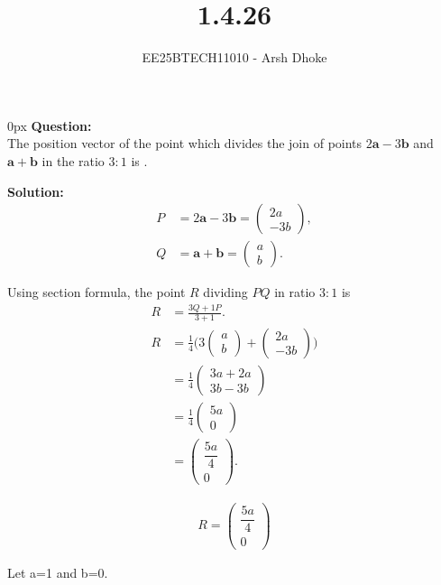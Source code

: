 \documentclass[journal]{IEEEtran}
\renewcommand{\vec}[1]{\mathbf{#1}}
\newcommand{\solution}{\textbf{Solution: }}
\newcommand{\brak}[1]{\begin{pmatrix}#1\end{pmatrix}}
\begin{document}

\vspace{3cm}

\title{1.4.26}
\author{EE25BTECH11010 - Arsh Dhoke}
{\let\newpage\relax\maketitle}

\renewcommand{\thefigure}{\theenumi}
\renewcommand{\thetable}{\theenumi}
\setlength{\intextsep}{10pt}

\parindent 0px
\textbf{Question:} \\
The position vector of the point which divides the join of points $2\vec{a} - 3\vec{b}$ and $\vec{a} + \vec{b}$ in the ratio $3:1$ is \underline{\hspace{2cm}}.

\solution \\

\begin{align}
P &= 2\vec{a} - 3\vec{b}
   = \brak{2a\\-3b}, \\
Q &= \vec{a} + \vec{b}
   = \brak{a\\b}.
\end{align}

Using section formula, the point $R$ dividing $PQ$ in ratio $3:1$ is
\begin{align}
R &= \frac{3Q + 1P}{3+1}. \\
R
&= \frac{1}{4}\Big(3\brak{a\\b}+\brak{2a\\-3b}\Big) \\[6pt]
&= \frac{1}{4}\brak{3a+2a\\3b-3b} \\[6pt]
&= \frac{1}{4}\brak{5a\\0} \\[6pt]
&= \brak{\dfrac{5a}{4}\\0}.
\end{align}

\begin{align}
\boxed{\,R = \brak{\dfrac{5a}{4}\\0}\,}
\end{align}

Let a=1 and b=0.
\end{document}
